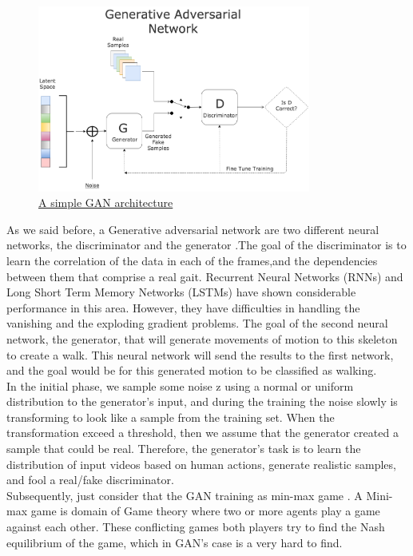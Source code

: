  

 
 \begin{figure}[h]
	\centering
	\includegraphics[width=0.8\textwidth]{figures/background/GAN.png}
	\captionsetup{labelformat=empty}
	\caption{\href{https://bolster.ai/blog/content/images/2020/04/GAN-1.png}
	{A simple GAN architecture}}
\end{figure}


As we said before, a Generative adversarial network are two different neural networks, the discriminator and the generator .The goal of the discriminator is to learn the correlation of the data in each of the frames,and the dependencies between them that comprise a real gait. Recurrent Neural Networks (RNNs) and Long Short Term Memory Networks (LSTMs) have shown considerable performance in this area. However, they have difficulties in handling the vanishing and the exploding gradient problems. The goal of the second neural network, the generator, that will generate movements of motion to this skeleton to create a walk. This neural network will send the results to the first network, and the goal would be for this generated motion to be classified as walking. \\


In the initial phase, we sample some noise z using a normal or uniform distribution to the generator's input, and during the training the noise slowly is transforming to look like a sample from the training set. When the transformation exceed a threshold, then we assume that the generator created a sample that could be real. Therefore, the generator's task is to learn the distribution of input videos based on human actions, generate realistic samples, and fool a real/fake discriminator.\\

Subsequently, just consider that the GAN training as min-max game \cite{Human Action Generation with Generative Adversarial Networks}. A Mini-max game is domain of Game theory where two or more agents play a game against each other. These conflicting games both players try to find the Nash equilibrium of the game, which in GAN's case is a very hard to find. 

